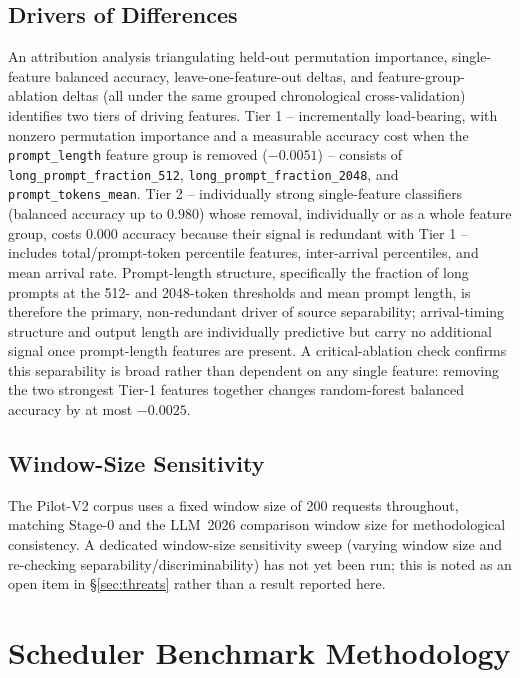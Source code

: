 \documentclass[sn-basic,Numbered,pdflatex]{sn-jnl}
\begin{document}
\subsection{Drivers of Differences}
\label{sec:drivers}

An attribution analysis triangulating held-out permutation importance,
single-feature balanced accuracy, leave-one-feature-out deltas, and
feature-group-ablation deltas (all under the same grouped chronological
cross-validation) identifies two tiers of driving features. Tier 1 --
incrementally load-bearing, with nonzero permutation importance and a
measurable accuracy cost when the \texttt{prompt\_length} feature group is
removed ($-0.0051$) -- consists of \texttt{long\_prompt\_fraction\_512},
\texttt{long\_prompt\_fraction\_2048}, and \texttt{prompt\_tokens\_mean}.
Tier 2 -- individually strong single-feature classifiers (balanced accuracy
up to $0.980$) whose removal, individually or as a whole feature group,
costs $0.000$ accuracy because their signal is redundant with Tier 1 --
includes total/prompt-token percentile features, inter-arrival percentiles,
and mean arrival rate. Prompt-length structure, specifically the fraction
of long prompts at the 512- and 2048-token thresholds and mean prompt
length, is therefore the primary, non-redundant driver of source
separability; arrival-timing structure and output length are individually
predictive but carry no additional signal once prompt-length features are
present. A critical-ablation check confirms this separability is broad
rather than dependent on any single feature: removing the two strongest
Tier-1 features together changes random-forest balanced accuracy by at
most $-0.0025$.

\subsection{Window-Size Sensitivity}
\label{sec:window-size}

The Pilot-V2 corpus uses a fixed window size of 200 requests throughout,
matching Stage-0 and the LLM~2026 comparison window size for
methodological consistency. A dedicated window-size sensitivity sweep
(varying window size and re-checking separability/discriminability) has
not yet been run; this is noted as an open item in
\S\ref{sec:threats} rather than a result reported here.

\section{Scheduler Benchmark Methodology}
\label{sec:methodology}
\end{document}

